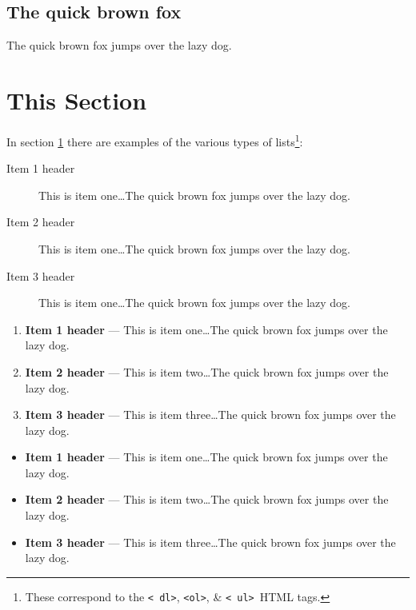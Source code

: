 \documentclass[11pt]{article}%
\begin{document}
\begin{multicols*}{2}
\lipsum[1]

\subsection{The quick brown fox}
\label{The quick brown fox}

The quick brown fox
jumps over the lazy
dog. \lipsum[2]

\section{This Section}
\label{This Section}

In section \ref{This Section} there are examples of the various
types of lists\footnote{These correspond to the {\tt \textless
dl\textgreater}, {\tt \textless ol\textgreater}, \& {\tt \textless
ul\textgreater}\ HTML tags.}:

\begin{description}
\item[Item 1 header] This is item one\dots The quick brown fox jumps
over the lazy dog.
\item[Item 2 header] This is item one\dots The quick brown fox jumps
over the lazy dog.
\item[Item 3 header] This is item one\dots The quick brown fox jumps
over the lazy dog.
\end{description}

\begin{enumerate}
\item {\bf Item 1 header} --- This is item one\dots The quick brown fox jumps
over the lazy dog.
\item {\bf Item 2 header} --- This is item two\dots The quick brown fox jumps
over the lazy dog.
\item {\bf Item 3 header} --- This is item three\dots The quick brown fox jumps
over the lazy dog.
\end{enumerate}

\begin{itemize}
\item {\bf Item 1 header} --- This is item one\dots The quick brown fox jumps
over the lazy dog.
\item {\bf Item 2 header} --- This is item two\dots The quick brown fox jumps
over the lazy dog.
\item {\bf Item 3 header} --- This is item three\dots The quick brown fox jumps
over the lazy dog.
\end{itemize}


\end{multicols*}
\end{document}
